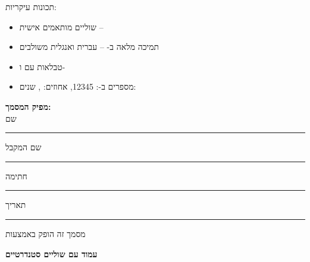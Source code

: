 \documentclass{hebrew-academic-template}
\begin{document}
\vspace{2mm}

תכונות עיקריות:
\begin{itemize}
\item שוליים מותאמים אישית -- 
\item תמיכה מלאה ב- -- עברית ואנגלית משולבים
\item טבלאות  עם  ו-
\item מספרים ב-: \num{12345}, אחוזים: , שנים: 
\end{itemize}

\vspace{3mm}

\vspace*{\fill}

\noindent%
\begin{minipage}[b]{0.45\textwidth}
\fontsize{10pt}{12pt}\selectfont
\textbf{מפיק המסמך:}\\
שם \rule{4cm}{0.3pt}
\end{minipage}%
\hfill%
\begin{minipage}[b]{0.45\textwidth}
\begin{flushleft}
\fontsize{10pt}{12pt}\selectfont
שם המקבל\rule{3cm}{0.3pt}\quad חתימה\rule{2cm}{0.3pt}\quad תאריך\rule{2.5cm}{0.3pt}
\end{flushleft}
\end{minipage}

\vspace{8mm}

\begin{center}
\fontsize{8pt}{10pt}\selectfont
מסמך זה הופק באמצעות  \en{\clsversion}
\end{center}

\newpage
\restoregeometry  %

\begin{center}
\fontsize{16pt}{20pt}\selectfont
\textbf{עמוד עם שוליים סטנדרטיים}
\end{center}

\vspace{5mm}
\end{document}
